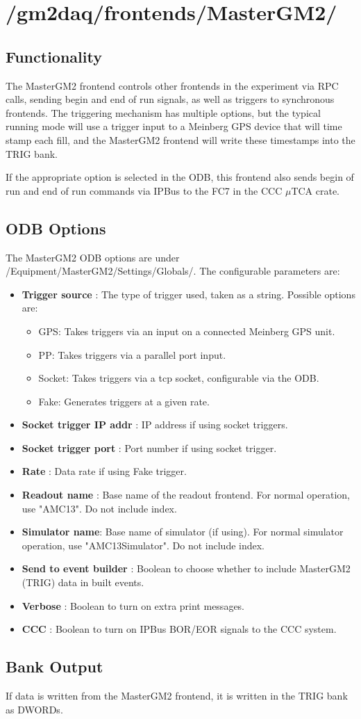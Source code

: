 \section{/gm2daq/frontends/MasterGM2/}

\subsection{Functionality}

The MasterGM2 frontend controls other frontends in the experiment via RPC calls, sending begin and end of run signals, as well as triggers to synchronous frontends. The triggering mechanism has multiple options, but the typical running mode will use a trigger input to a Meinberg GPS device that will time stamp each fill, and the MasterGM2 frontend will write these timestamps into the TRIG bank.

If the appropriate option is selected in the ODB, this frontend also sends begin of run and end of run commands via IPBus to the FC7 in the CCC $\mu$TCA crate.

\subsection{ODB Options}

The MasterGM2 ODB options are under /Equipment/MasterGM2/Settings/Globals/. The configurable parameters are:

\begin{itemize}
\item {\bf Trigger source} : The type of trigger used, taken as a string. Possible options are:
\begin{itemize}
\item GPS: Takes triggers via an input on a connected Meinberg GPS unit.
\item PP: Takes triggers via a parallel port input.
\item Socket: Takes triggers via a tcp socket, configurable via the ODB.
\item Fake: Generates triggers at a given rate.
\end{itemize}
\item {\bf Socket trigger IP addr} : IP address if using socket triggers.
\item {\bf Socket trigger port} : Port number if using socket trigger.
\item {\bf Rate} : Data rate if using Fake trigger.
\item {\bf Readout name} : Base name of the readout frontend. For normal operation, use "AMC13". Do not include index.
\item {\bf Simulator name}: Base name of simulator (if using). For normal simulator operation, use "AMC13Simulator". Do not include index.
\item {\bf Send to event builder} : Boolean to choose whether to include MasterGM2 (TRIG) data in built events.
\item {\bf Verbose} : Boolean to turn on extra print messages.
\item {\bf CCC} : Boolean to turn on IPBus BOR/EOR signals to the CCC system.
\end{itemize}

\subsection{Bank Output}

If data is written from the MasterGM2 frontend, it is written in the TRIG bank as DWORDs.